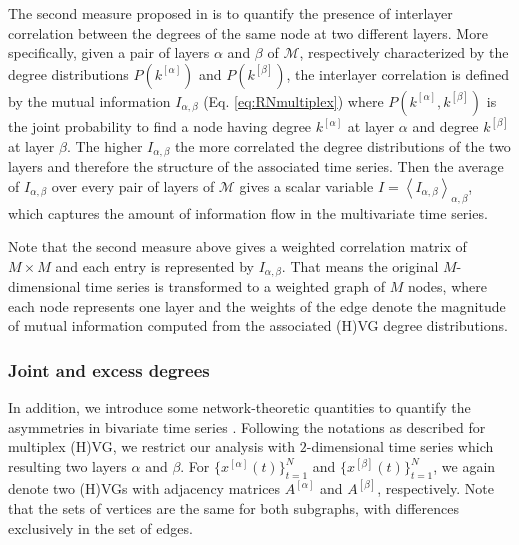 		The second measure proposed in \cite{Lacasa2015b} is to quantify the presence of interlayer correlation between the degrees of the same node at two different layers. More specifically, given a pair of layers $\alpha$ and $\beta$ of $\mathcal{M}$, respectively characterized by the degree distributions $P(k^{[\alpha]})$ and $P(k^{[\beta]})$, the interlayer correlation is defined by the mutual information $I_{\alpha, \beta}$ (Eq. \eqref{eq:RNmultiplex}) %
		where $P(k^{[\alpha]}, k^{[\beta]}) $ is the joint probability to find a node having degree $k^{[\alpha]}$ at layer $\alpha$ and degree $k^{[\beta]}$ at layer $\beta$. The higher $I_{\alpha, \beta}$ the more correlated the degree distributions of the two layers and therefore the structure of the associated time series. Then the average of $I_{\alpha, \beta}$ over every pair of layers of $\mathcal{M}$ gives a scalar variable $I = \left < I_{\alpha, \beta}\right>_{\alpha, \beta}$, which captures the amount of information flow in the multivariate time series. 
		
		Note that the second measure above gives a weighted correlation matrix of $M \times M$ and each entry is represented by $I_{\alpha, \beta}$. That means the original $M$-dimensional time series is transformed to a weighted graph of $M$ nodes, where each node represents one layer and the weights of the edge denote the magnitude of mutual information computed from the associated (H)VG degree distributions.  
						
		\subsubsection{Joint and excess degrees} \label{subsec:jointdegreeVG}
		In addition, we introduce some network-theoretic quantities to quantify the asymmetries in bivariate time series \cite{Zou2014}. Following the notations as described for multiplex (H)VG, we restrict our analysis with $2$-dimensional time series which resulting two layers $\alpha$ and $\beta$. For $\{x^{[\alpha]}(t)\}_{t=1}^{N}$ and $\{x^{[\beta]}(t)\}_{t=1}^{N}$, we again denote two (H)VGs with adjacency matrices $A^{[\alpha]}$ and $A^{[\beta]}$, respectively. Note that the sets of vertices are the same for both subgraphs, with differences exclusively in the set of edges.

